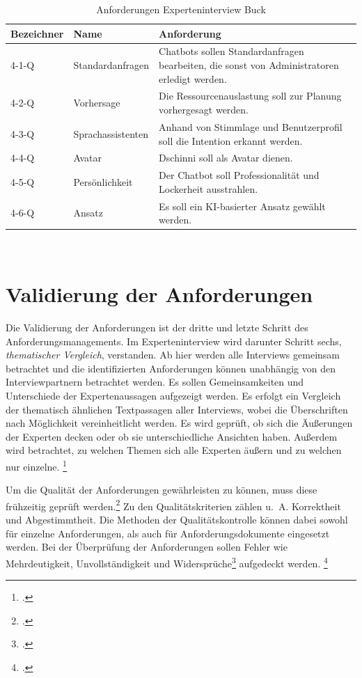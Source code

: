 \begin{table}[H]
\centering
\begin{tabularx}{1\textwidth}{l|l|X}
  Bezeichner & Name & Anforderung \\\hline
  4-1-Q & Standardanfragen & Chatbots sollen Standardanfragen bearbeiten, die sonst von Administratoren erledigt werden. \\
  4-2-Q & Vorhersage & Die Ressourcenauslastung soll zur Planung vorhergesagt werden. \\
  4-3-Q & Sprachassistenten & Anhand von Stimmlage und Benutzerprofil soll die Intention erkannt werden. \\
  4-4-Q & Avatar & Dschinni soll als Avatar dienen. \\
  4-5-Q & Persönlichkeit & Der Chatbot soll Professionalität und Lockerheit ausstrahlen. \\
  4-6-Q & Ansatz & Es soll ein KI-basierter Ansatz gewählt werden. \\
\end{tabularx}
\\\eigen
\caption{Anforderungen Experteninterview Buck}
\label{tab:expbuck}
\end{table}


\section{Validierung der Anforderungen} \label{Validierung}
Die Validierung der Anforderungen ist der dritte und letzte Schritt des Anforderungsmanagements. Im Experteninterview wird darunter Schritt sechs, \textit{thematischer Vergleich}, verstanden. Ab hier werden alle Interviews gemeinsam betrachtet und die identifizierten Anforderungen können unabhängig von den Interviewpartnern betrachtet werden. Es sollen Gemeinsamkeiten und Unterschiede der Expertenaussagen aufgezeigt werden.
Es erfolgt ein Vergleich der thematisch ähnlichen Textpassagen aller Interviews, wobei die Überschriften nach Möglichkeit vereinheitlicht werden. Es wird geprüft, ob sich die Äußerungen der Experten decken oder ob sie unterschiedliche Ansichten haben. Außerdem wird betrachtet, zu welchen Themen sich alle Experten äußern und zu welchen nur einzelne.
\footcites[Vgl.][459\psq]{Meuser_1991_Interview}[Vgl.][37]{Matthes_1986}

Um die Qualität der Anforderungen gewährleisten zu können, muss diese frühzeitig geprüft werden.\footcite[Vgl.][4]{Pohl_2015_Requirements}
Zu den Qualitätskriterien zählen u.~A. Korrektheit und Abgestimmtheit. Die Methoden der Qualitätskontrolle können dabei sowohl für einzelne Anforderungen, als auch für Anforderungsdokumente eingesetzt werden.
Bei der Überprüfung der Anforderungen sollen Fehler wie \glqq{}Mehrdeutigkeit, Unvollständigkeit und Widersprüche\grqq\footcite[][95]{Pohl_2015_Requirements} aufgedeckt werden.
\footcite[Vgl.][95]{Pohl_2015_Requirements}

